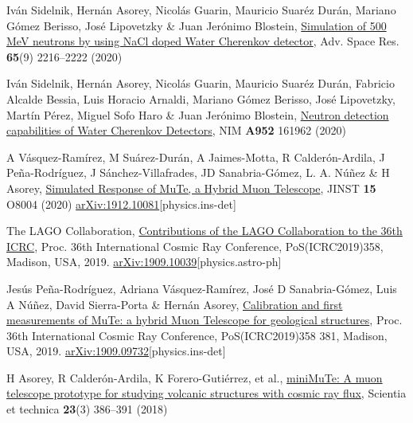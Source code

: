 \begin{etaremune}
\item {} Iván Sidelnik, Hernán Asorey, Nicolás Guarin, Mauricio Suaréz Durán, Mariano Gómez Berisso, José Lipovetzky \& Juan Jerónimo Blostein, \href{https://doi.org/10.1016/j.asr.2020.02.024}{{Simulation of 500 MeV neutrons by using NaCl doped Water Cherenkov detector}}, Adv.
Space Res. {\textbf{65}}(9) 2216--2222 (2020) %

\item {} Iván Sidelnik, Hernán Asorey, Nicolás Guarin, Mauricio Suaréz Durán, Fabricio Alcalde Bessia, Luis Horacio Arnaldi, Mariano Gómez Berisso, José Lipovetzky, Martín Pérez, Miguel Sofo Haro \& Juan Jerónimo Blostein, \href{https://doi.org/10.1016/j.nima.2019.03.017}{{Neutron detection capabilities of Water Cherenkov Detectors}}, NIM {\textbf{A952}} 161962 (2020) %

\item {} A Vásquez-Ramírez, M Suárez-Durán, A Jaimes-Motta, R Calderón-Ardila, J Peña-Rodríguez, J Sánchez-Villafrades, JD Sanabria-Gómez, L. A. Núñez \& H Asorey, \href{https://doi.org/10.1088/1748-0221/15/08/P08004}{{Simulated Response of MuTe, a Hybrid Muon Telescope}}, JINST {\textbf{15}} O8004 (2020) \href{https://arxiv.org/abs/1912.10081}{arXiv:1912.10081}[physics.ins-det]

\item {} The LAGO Collaboration, \href{https://arxiv.org/abs/1909.10039}{Contributions of the LAGO Collaboration to the 36th ICRC}, \en Proc.
36th International Cosmic Ray Conference, PoS(ICRC2019)358, Madison, USA, 2019. \href{http://arxiv.org/abs/1909.10039}{arXiv:1909.10039}[physics.astro-ph]

\item {} Jesús Peña-Rodríguez, Adriana Vásquez-Ramírez, José D Sanabria-Gómez, Luis A Núñez, David Sierra-Porta \& Hernán Asorey, \href{https://pos.sissa.it/358/381/}{Calibration and first measurements of MuTe: a hybrid Muon Telescope for geological structures}, \en Proc.
36th International Cosmic Ray Conference, PoS(ICRC2019)358 381, Madison, USA, 2019. \href{http://arxiv.org/abs/1909.09732}{arXiv:1909.09732}[physics.ins-det]

\item {} H Asorey, R Calderón-Ardila, K Forero-Gutiérrez, et al., \href{http://dx.doi.org/10.22517/23447214.17501}{miniMuTe: A muon telescope prototype for studying volcanic structures with cosmic ray flux}, Scientia et technica {\textbf{23}}(3) 386--391 (2018)


\end{etaremune}
